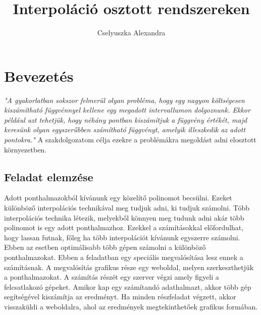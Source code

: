 \documentclass{elteikthesis}
\title{Interpoláció osztott rendszereken}
\author{Cselyuszka Alexandra}
\begin{document}
\frontmatter

	\maketitle

\mainmatter

\tableofcontents
	
\chapter{Bevezetés} 

\textit{
"A gyakorlatban sokszor felmerül olyan probléma, hogy egy nagyon költségesen kiszámítható függvénnyel kellene egy megadott intervallumon dolgoznunk. Ekkor például azt tehetjük, hogy néhány pontban kiszámítjuk a függvény értékét, majd keresünk olyan egyszerűbben számítható függvényt, amelyik illeszkedik az adott pontokra." }\cite{numanalbev}
\newline
\newline
A szakdolgozatom célja ezekre a problémákra megoldást adni elosztott környezetben. 
\section{Feladat elemzése}
Adott ponthalmazokból kívánunk egy közelítő polinomot becsülni. Ezeket különböző interpolációs technikával meg tudjuk adni, ki tudjuk számolni. Több interpolációs technika létezik, melyekből könnyen meg tudunk adni akár több polinomot is egy adott ponthalmazhoz.\newline
Ezekkel a számításokkal előfordulhat, hogy lassan futnak, főleg ha több interpolációt kívánunk egyszerre számolni.
Ebben az esetben optimálisabb több gépen számolni a különböző ponthalmazokat.
\newline\newline
Ebben a feladatban egy speciális megvalósítása lesz ennek a számításnak. 
\newline
A megvalósítás grafikus része egy weboldal, melyen szerkeszthetjük a ponthalmazokat. A számítás részét egy szerver végzi amely figyeli a felcsatlakozó gépeket. Amikor kap egy számítandó adathalmazt, akkor több gép segítségével kiszámítja az eredményt. Ha minden részfeladat végzett, akkor visszaküldi a weboldalra, ahol az eredmények megtekinthetőek grafikus formában.
\newline\newline
\end{document}
